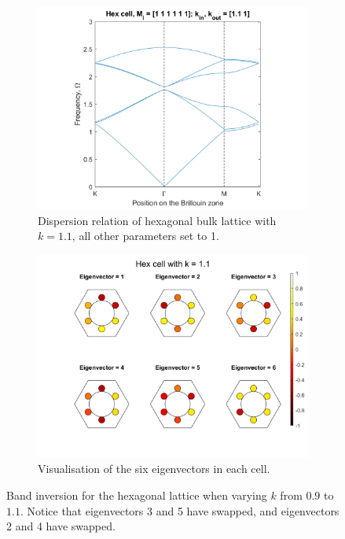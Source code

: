 \begin{figure}
\medskip
\centering
\begin{subfigure}[b]{.5\textwidth}
  \centering
  \includegraphics[width=1\linewidth]{imgs/hexinvdispermore.png}
  \caption{Dispersion relation of hexagonal bulk lattice with $k=1.1$, all
other parameters set to 1.}
  \label{fig:sub1}
\end{subfigure}%
\begin{subfigure}[b]{.5\textwidth}
  \centering
  \includegraphics[width=1\linewidth]{imgs/hexinversionmore.png}
  \caption{Visualisation of the six eigenvectors in each cell.}
  \label{fig:sub2}
\end{subfigure}
\caption{Band inversion for the hexagonal lattice when varying $k$ from $0.9$
to $1.1$. Notice that eigenvectors 3 and 5 have swapped, and eigenvectors 2 and
4 have swapped.}
\label{fig:hexinversion}
\end{figure}

